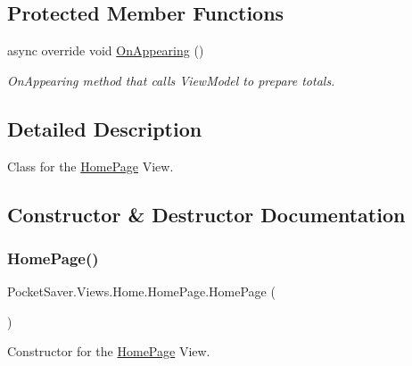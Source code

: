 \subsection*{Protected Member Functions}
\begin{DoxyCompactItemize}
\item 
async override void \hyperlink{class_pocket_saver_1_1_views_1_1_home_1_1_home_page_a47aecb7aa46d3e9e22867599a254b478}{On\+Appearing} ()
\begin{DoxyCompactList}\small\item\em On\+Appearing method that calls View\+Model to prepare totals. \end{DoxyCompactList}\end{DoxyCompactItemize}


\subsection{Detailed Description}
Class for the \hyperlink{class_pocket_saver_1_1_views_1_1_home_1_1_home_page}{Home\+Page} View. 



\subsection{Constructor \& Destructor Documentation}
\mbox{\label{class_pocket_saver_1_1_views_1_1_home_1_1_home_page_a816da50c9151c39febfe0f5803a2cdb3}} 
\subsubsection{\texorpdfstring{Home\+Page()}{HomePage()}}
{\footnotesize\ttfamily Pocket\+Saver.\+Views.\+Home.\+Home\+Page.\+Home\+Page (\begin{DoxyParamCaption}{ }\end{DoxyParamCaption})\hspace{0.3cm}{\ttfamily [inline]}}



Constructor for the \hyperlink{class_pocket_saver_1_1_views_1_1_home_1_1_home_page}{Home\+Page} View. 



